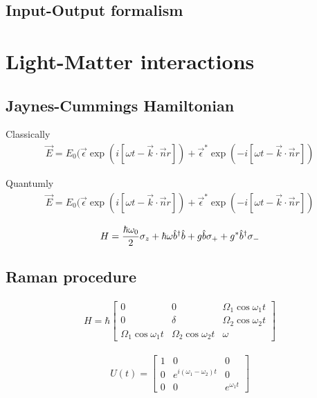 \subsection{Input-Output formalism}



\section{Light-Matter interactions}

\subsection{Jaynes-Cummings Hamiltonian}

Classically
\begin{align}
  \vec{E} = E_0 (\vec{\epsilon}\exp(i[\omega t - \vec{k}\cdot\vec{n}r]) + \vec{\epsilon}^*\exp(-i[\omega t - \vec{k}\cdot\vec{n}r])
\end{align}

Quantumly
\begin{align}
  \vec{E} = E_0 (\vec{\epsilon}\exp(i[\omega t - \vec{k}\cdot\vec{n}r]) + \vec{\epsilon}^*\exp(-i[\omega t - \vec{k}\cdot\vec{n}r])
\end{align}

\begin{align}
  H = \frac{\hbar \omega_0}{2} \mathbf{\sigma}_z + \hbar \omega \hat{b}^\dagger\hat{b} + g\hat{b} \mathbf{\sigma}_{+} + g^{*}\hat{b}^\dagger \mathbf{\sigma}_{-}
\end{align}

\subsection{Raman procedure}


\begin{align}
  H=\hbar
  \begin{bmatrix}
    0 & 0 & \Omega_1 \cos\omega_1 t \\
    0 & \delta & \Omega_2 \cos\omega_2 t \\
    \Omega_1 \cos\omega_1 t & \Omega_2 \cos\omega_2 t & \omega
  \end{bmatrix}
\end{align}

\begin{align}
  U(t) = 
  \begin{bmatrix}
    1 & 0 & 0 \\
    0 & e^{i(\omega_1 - \omega_2)t} & 0 \\
    0 & 0 & e^{\omega_1 t}
  \end{bmatrix}
\end{align}

